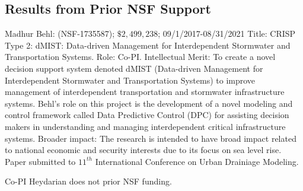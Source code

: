 \subsection{Results from Prior NSF Support}
\label{subsec:prior}

Madhur Behl: (NSF-1735587); $\$2,499,238$; 09/1/2017-08/31/2021 Title: CRISP Type 2: dMIST: Data-driven Management for Interdependent Stormwater and Transportation Systems. Role: Co-PI. Intellectual Merit: To create a novel decision support system denoted dMIST (Data-driven Management for Interdependent Stormwater and Transportation Systems) to improve management of interdependent transportation and stormwater infrastructure systems. Behl's role on this project is the development of a novel modeling and control framework called Data Predictive Control (DPC) for assisting decision makers in understanding and managing interdependent critical infrastructure systems. Broader impact: The research is intended to have broad impact related to national economic and security interests due to its focus on sea level rise. Paper submitted to $11^{th}$ International Conference on Urban Drainiage Modeling. 



\vspace{4pt}%
{}

\vspace{4pt}%
{}


Co-PI Heydarian does not prior NSF funding. 
